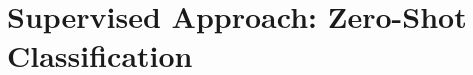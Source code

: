 \renewcommand{\imagepath}{../70-supervised/img}

\chapter{Supervised Approach: Zero-Shot Classification}